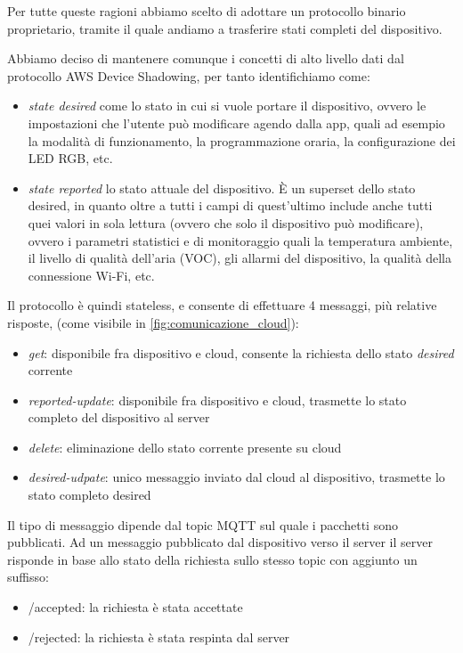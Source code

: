 \documentclass[12pt,a4paper,twoside,titlepage]{book}
\begin{document}
Per tutte queste ragioni abbiamo scelto di adottare un protocollo binario proprietario,
tramite il quale andiamo a trasferire stati completi del dispositivo.

Abbiamo deciso di mantenere comunque i concetti di alto livello dati dal protocollo AWS
Device Shadowing, per tanto identifichiamo come:
\begin{itemize}
    \item \textit{state desired} come lo stato in cui si vuole portare il dispositivo, ovvero le
        impostazioni che l'utente può modificare agendo dalla app, quali ad esempio la modalità di funzionamento,
        la programmazione oraria, la configurazione dei LED RGB, etc.
    \item \textit{state reported} lo stato attuale del dispositivo. È un superset dello stato
        desired, in quanto oltre a tutti i campi di quest'ultimo include anche tutti quei valori
        in sola lettura (ovvero che solo il dispositivo può modificare), ovvero i parametri
        statistici e di monitoraggio quali la temperatura ambiente, il livello di qualità dell'aria (VOC),
        gli allarmi del dispositivo, la qualità della connessione Wi-Fi, etc.
\end{itemize}

Il protocollo è quindi stateless, e consente di effettuare 4 messaggi, più relative risposte,
(come visibile in \autoref{fig:comunicazione_cloud}):

\begin{itemize}
    \item \textit{get}: disponibile fra dispositivo e cloud, consente la richiesta dello stato \textit{desired} corrente
    \item \textit{reported-update}: disponibile fra dispositivo e cloud, trasmette lo stato
        completo del dispositivo al server
    \item \textit{delete}: eliminazione dello stato corrente presente su cloud
    \item \textit{desired-udpate}: unico messaggio inviato dal cloud al dispositivo,
        trasmette lo stato completo desired
\end{itemize}

Il tipo di messaggio dipende dal topic MQTT sul quale i pacchetti sono pubblicati. Ad
un messaggio pubblicato dal dispositivo verso il server il server risponde in base allo
stato della richiesta sullo stesso topic con aggiunto un suffisso:
\begin{itemize}
    \item /accepted: la richiesta è stata accettate
    \item /rejected: la richiesta è stata respinta dal server
\end{itemize}
\end{document}
